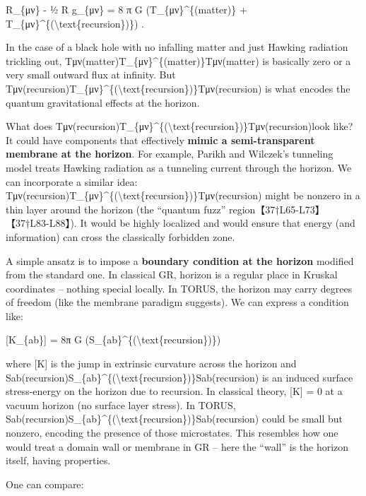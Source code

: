 \documentclass[]{article}
\begin{document}
R\_\{μν\} - ½ R g\_\{μν\} = 8 π G (T\_\{μν\}\^{}\{(matter)\} +
T\_\{μν\}\^{}\{(\textbackslash{}text\{recursion\})\}) .

In the case of a black hole with no infalling matter and just Hawking
radiation trickling out,
Tμν(matter)T\_\{μν\}\^{}\{(matter)\}Tμν(matter)​ is basically zero or a
very small outward flux at infinity. But
Tμν(recursion)T\_\{μν\}\^{}\{(\textbackslash{}text\{recursion\})\}Tμν(recursion)​
is what encodes the quantum gravitational effects at the horizon.

What does
Tμν(recursion)T\_\{μν\}\^{}\{(\textbackslash{}text\{recursion\})\}Tμν(recursion)​
look like? It could have components that effectively \textbf{mimic a
semi-transparent membrane at the horizon}. For example, Parikh and
Wilczek's tunneling model treats Hawking radiation as a tunneling
current through the horizon. We can incorporate a similar idea:
Tμν(recursion)T\_\{μν\}\^{}\{(\textbackslash{}text\{recursion\})\}Tμν(recursion)​
might be nonzero in a thin layer around the horizon (the ``quantum
fuzz'' region【37†L65-L73】【37†L83-L88】). It would be highly localized
and would ensure that energy (and information) can cross the classically
forbidden zone.

A simple ansatz is to impose a \textbf{boundary condition at the
horizon} modified from the standard one. In classical GR, horizon is a
regular place in Kruskal coordinates -- nothing special locally. In
TORUS, the horizon may carry degrees of freedom (like the membrane
paradigm suggests). We can express a condition like:

{[}K\_\{ab\}{]} = 8π G
(S\_\{ab\}\^{}\{(\textbackslash{}text\{recursion\})\})

where {[}K{]} is the jump in extrinsic curvature across the horizon and
Sab(recursion)S\_\{ab\}\^{}\{(\textbackslash{}text\{recursion\})\}Sab(recursion)​
is an induced surface stress-energy on the horizon due to recursion. In
classical theory, {[}K{]} = 0 at a vacuum horizon (no surface layer
stress). In TORUS,
Sab(recursion)S\_\{ab\}\^{}\{(\textbackslash{}text\{recursion\})\}Sab(recursion)​
could be small but nonzero, encoding the presence of those microstates.
This resembles how one would treat a domain wall or membrane in GR --
here the ``wall'' is the horizon itself, having properties.

One can compare:
\end{document}
